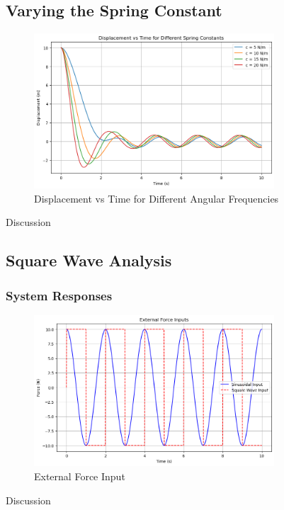 \documentclass[12pt,a4paper]{article}
\begin{document}
\subsection{Varying the Spring Constant}
\begin{figure}[H]
    \centering
    \includegraphics[width=0.8\textwidth]{spring_constant_effect_on_system.png} 
    \caption{Displacement vs Time for Different Angular Frequencies}
    \label{fig:system}
\end{figure}
{\vspace{10pt}}
Discussion
{\vspace{10pt}}


\subsection{Square Wave Analysis}
\subsubsection{System Responses}
\begin{figure}[H]
    \centering
    \includegraphics[width=0.8\textwidth]{force_input.png} 
    \caption{External Force Input}
    \label{fig:system}
\end{figure}
{\vspace{10pt}}
Discussion
{\vspace{10pt}}
\end{document}
